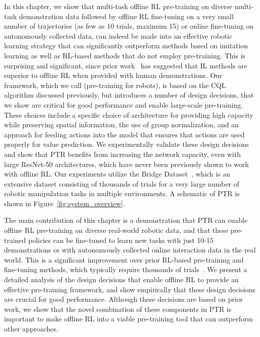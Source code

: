 In this chapter, we show that multi-task offline RL pre-training on diverse multi-task demonstration data followed by offline RL fine-tuning on a very small number of trajectories (as few as 10 trials, maximum 15) or online fine-tuning on autonomously collected data, can indeed be made into an effective robotic learning strategy that can significantly outperform methods based on imitation learning as well as RL-based methods that do not employ pre-training. This is surprising and significant, since prior work~\citep{mandlekar2021what} has suggested that IL methods are superior to offline RL when provided with human demonstrations. Our framework, which we call \ptrmethodname (pre-training for robots), is based on the CQL algorithm discussed previously, but introduces a number of design decisions, that we show are critical for good performance and enable large-scale pre-training. These choices include a specific choice of architecture for providing high capacity while preserving spatial information, the use of group normalization, and an approach for feeding actions into the model that ensures that actions are used properly for value prediction. We experimentally validate these design decisions and show that PTR benefits from increasing the network capacity, even with large ResNet-50 architectures, which have never been previously shown to work with offline RL. Our experiments utilize the Bridge Dataset~\citep{ebert2021bridge}, which is an extensive dataset consisting of thousands of trials for a very large number of robotic manipulation tasks in multiple environments. A schematic of PTR is shown in Figure~\ref{fig:system_overview}. 

The main contribution of this chapter is a demonstration that PTR can enable offline RL pre-training on diverse real-world robotic data, and that these pre-trained policies can be fine-tuned to learn new tasks with just 10-15 demonstrations or with autonomously collected online interaction data in the real world. This is a significant improvement over prior RL-based pre-training and fine-tuning methods, which typically require thousands of trials~\citep{singh2020cog,kalashnikov2021mt,julian2020never,chebotar2021actionable,lee2022spend}. We present a detailed analysis of the design decisions that enable offline RL to provide an effective pre-training framework, and show empirically that these design decisions are crucial for good performance. {Although these decisions are based on prior work, we show that the novel combination of these components in PTR is important to make offline RL into a viable pre-training tool that can outperform other approaches.}
